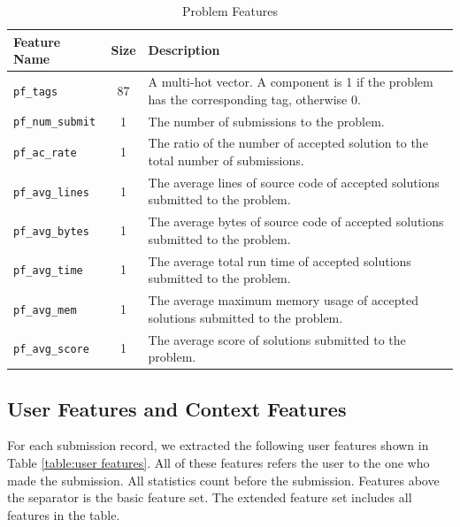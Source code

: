         \begin{table}[hpbt]
        \begin{adjustwidth}{-1.5cm}{-1.5cm}
        \centering
        \begin{tabular}{lcp{12.5cm}}
            \hline
            Feature Name & Size & Description \\
            \hline
            {\footnotesize\verb|pf_tags|} & 87 &
                A multi-hot vector.\newline
                A component is 1 if the problem has the corresponding tag, otherwise 0. \\
            {\footnotesize\verb|pf_num_submit|} & 1 &
                The number of submissions to the problem. \\
            {\footnotesize\verb|pf_ac_rate|} & 1 &
                The ratio of the number of accepted solution to the total number of submissions. \\
            {\footnotesize\verb|pf_avg_lines|} & 1 &
                The average lines of source code of accepted solutions submitted to the problem. \\
            {\footnotesize\verb|pf_avg_bytes|} & 1 &
                The average bytes of source code of accepted solutions submitted to the problem. \\
            {\footnotesize\verb|pf_avg_time|} & 1 &
                The average total run time of accepted solutions submitted to the problem. \\
            {\footnotesize\verb|pf_avg_mem|} & 1 &
                The average maximum memory usage of accepted solutions submitted to the problem. \\
            {\footnotesize\verb|pf_avg_score|} & 1 &
                The average score of solutions submitted to the problem. \\
            \hline
        \end{tabular}
        \caption{Problem Features}
        \label{table:problem features}
        \end{adjustwidth}
        \end{table}

    \subsection{User Features and Context Features}

        For each submission record, we extracted the following user features shown in Table \ref{table:user features}.
        All of these features refers the user to the one who made the submission.
        All statistics count before the submission.
        Features above the separator is the basic feature set.
        The extended feature set includes all features in the table.

